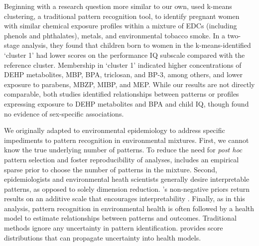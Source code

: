 Beginning with a research question more similar to our own, \citet{kalloo2021chemical} used k-means clustering, a traditional pattern recognition tool, to identify pregnant women with similar chemical exposure profiles within a mixture of EDCs (including phenols and phthalates), metals, and environmental tobacco smoke. In a two-stage analysis, they found that children born to women in the k-means-identified `cluster 1' had lower scores on the performance IQ subscale compared with the reference cluster. Membership in `cluster 1' indicated higher concentrations of DEHP metabolites, MBP, BPA, triclosan, and BP-3, among others, and lower exposure to parabens, MBZP, MIBP, and MEP. While our results are not directly comparable, both studies identified relationships between patterns or profiles expressing exposure to DEHP metabolites and BPA and child IQ, though \citet{kalloo2021chemical} found no evidence of sex-specific associations.

We originally adapted \bnmf to environmental epidemiology to address specific impediments to pattern recognition in environmental mixtures. First, we cannot know the true underlying number of patterns. To reduce the need for \textit{post hoc} pattern selection and foster reproducibility of analyses, \bnmf includes an empirical sparse prior to choose the number of patterns in the mixture. Second, epidemiologists and environmental heath scientists generally desire interpretable patterns, as opposed to solely dimension reduction. \bnmfc's non-negative priors return results on an additive scale that encourages interpretability \citep{lee1999learning}. Finally, as in this analysis, pattern recognition in environmental health is often followed by a health model to estimate relationships between patterns and outcomes. Traditional methods ignore any uncertainty in pattern identification. \bnmf provides score distributions that can propagate uncertainty into health models.


